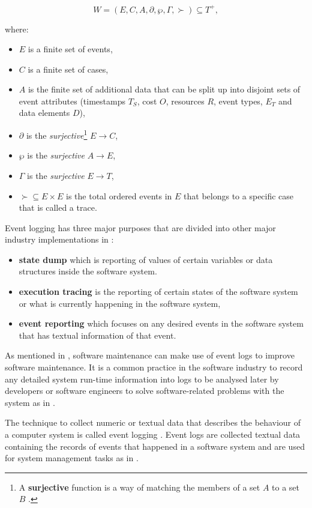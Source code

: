 \begin{equation}
	\label{eq:LogEvent}
	W = (E, C, A, \partial, \wp, \Gamma, \succ) \subseteq T^+,
\end{equation}

where:

\begin{itemize}
	\item $E$ is a finite set of events,
	\item $C$ is a finite set of cases,
	\item $A$ is the finite set of additional data that can be split up into disjoint sets of event attributes (timestamps $T_S$, cost $O$, resources $R$, event types, $E_T$ and data elements $D$),
	\item $\partial$ is the \textit{surjective}\footnote{\label{ftn:Surjective}A \textbf{surjective} function is a way of matching the members of a set $A$ to a set $B$ \cite{Szendrei1990}.} $E\rightarrow C$,
	\item $\wp$ is the \textit{surjective} $A\rightarrow E$,
	\item $\Gamma$ is the \textit{surjective} $E\rightarrow T$,
	\item $\succ \subseteq E\times E$ is the total ordered events in $E$ that belongs to a specific case that is called a trace.
\end{itemize}


Event logging has three major purposes that are divided into other major industry implementations in  \cite{Pecchia2015}:

\begin{itemize}
	\item \textbf{state dump} which is reporting of values of certain variables or data structures inside the software system.
	\item \textbf{execution tracing} is the reporting of certain states of the software system or what is currently happening in the software system,
	\item \textbf{event reporting} which focuses on any desired events in the software system that has textual information of that event.
\end{itemize}

As mentioned in , software maintenance can make use of event logs to improve software maintenance. It is a common practice in the software industry to record any detailed system run-time information into logs to be analysed later by developers or software engineers to solve software-related problems with the system as in  \cite{Zhu2019}.\par The technique to collect numeric or textual data that describes the behaviour of a computer system is called event logging \cite{Pecchia2015, Baccanico2014}. Event logs are collected textual data containing the records of events that happened in a software system and are used for system management tasks as in  \cite{Rong2018a, Rong2018, Baccanico2014}.

